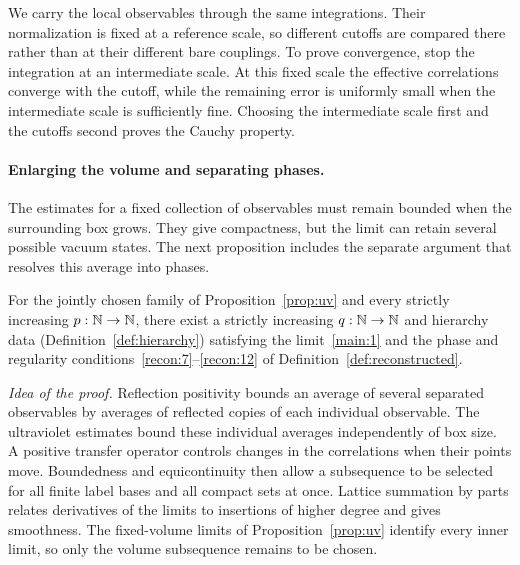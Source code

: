 We carry the local observables through the same integrations.
Their normalization is fixed at a reference scale, so different cutoffs are compared there rather than at their different bare couplings.
To prove convergence, stop the integration at an intermediate scale.
At this fixed scale the effective correlations converge with the cutoff, while the remaining error is uniformly small when the intermediate scale is sufficiently fine.
Choosing the intermediate scale first and the cutoffs second proves the Cauchy property.


\paragraph{Enlarging the volume and separating phases.}
The estimates for a fixed collection of observables must remain bounded when the surrounding box grows.
They give compactness, but the limit can retain several possible vacuum states.
The next proposition includes the separate argument that resolves this average into phases.

\begin{proposition}\label{prop:limit}
For the jointly chosen family of Proposition~\ref{prop:uv} and every strictly increasing $p:\mathbb N\to\mathbb N$, there exist a strictly increasing $q:\mathbb N\to\mathbb N$ and hierarchy data (Definition~\ref{def:hierarchy}) satisfying the limit~\ref{main:1} and the phase and regularity conditions~\ref{recon:7}--\ref{recon:12} of Definition~\ref{def:reconstructed}.
\end{proposition}

\emph{Idea of the proof.}
Reflection positivity bounds an average of several separated observables by averages of reflected copies of each individual observable.
The ultraviolet estimates bound these individual averages independently of box size.
A positive transfer operator controls changes in the correlations when their points move.
Boundedness and equicontinuity then allow a subsequence to be selected for all finite label bases and all compact sets at once.
Lattice summation by parts relates derivatives of the limits to insertions of higher degree and gives smoothness.
The fixed-volume limits of Proposition~\ref{prop:uv} identify every inner limit, so only the volume subsequence remains to be chosen.

